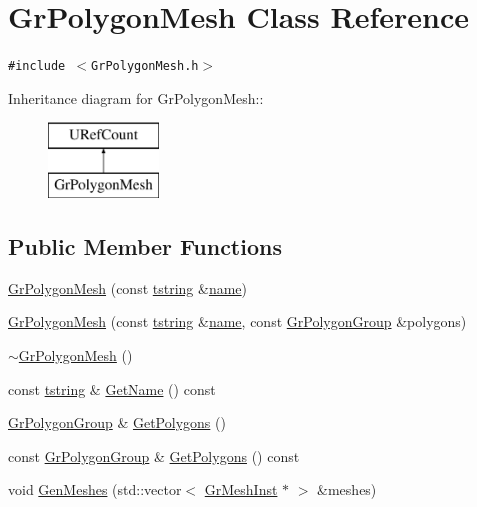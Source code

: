 \hypertarget{class_gr_polygon_mesh}{
\section{GrPolygonMesh Class Reference}
\label{class_gr_polygon_mesh}
}
{\tt \#include $<$GrPolygonMesh.h$>$}

Inheritance diagram for GrPolygonMesh::\begin{figure}[H]
\begin{center}
\leavevmode
\includegraphics[height=2cm]{class_gr_polygon_mesh}
\end{center}
\end{figure}
\subsection*{Public Member Functions}
\begin{CompactItemize}
\item 
\hyperlink{class_gr_polygon_mesh_00c5b077a2baf6d6dcbc6c5705641dfe}{GrPolygonMesh} (const \hyperlink{common__afx_8h_816fa58fd77499b0edb2c69ebe803d5c}{tstring} \&\hyperlink{glext__bak_8h_bb62efe59ccdd153ce42e1a418352209}{name})
\item 
\hyperlink{class_gr_polygon_mesh_258f1f26b77ceebf72d533e9d97e788f}{GrPolygonMesh} (const \hyperlink{common__afx_8h_816fa58fd77499b0edb2c69ebe803d5c}{tstring} \&\hyperlink{glext__bak_8h_bb62efe59ccdd153ce42e1a418352209}{name}, const \hyperlink{class_gr_polygon_group}{GrPolygonGroup} \&polygons)
\item 
\hyperlink{class_gr_polygon_mesh_150b9d7f3cc3903036050b93a7e5c724}{$\sim$GrPolygonMesh} ()
\item 
const \hyperlink{common__afx_8h_816fa58fd77499b0edb2c69ebe803d5c}{tstring} \& \hyperlink{class_gr_polygon_mesh_2a5e0fdcdada59995926c7a5228b8c83}{GetName} () const 
\item 
\hyperlink{class_gr_polygon_group}{GrPolygonGroup} \& \hyperlink{class_gr_polygon_mesh_e5d2b80dc774c03bd1ff368bf7c56fdd}{GetPolygons} ()
\item 
const \hyperlink{class_gr_polygon_group}{GrPolygonGroup} \& \hyperlink{class_gr_polygon_mesh_5eeb6f79723dd4cc8ac27928b1edf016}{GetPolygons} () const 
\item 
void \hyperlink{class_gr_polygon_mesh_49aba3242b4fc2c3c00496652f9830f4}{GenMeshes} (std::vector$<$ \hyperlink{class_gr_mesh_inst}{GrMeshInst} $\ast$ $>$ \&meshes)
\end{CompactItemize}


